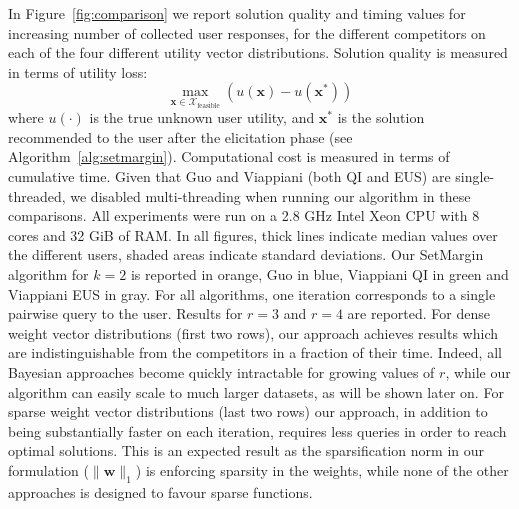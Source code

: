 \documentclass{article}
\renewcommand\[{\begin{equation}}
\renewcommand\]{\end{equation}}
\newcommand{\calvar}[1]{\ensuremath{\mathcal{#1}}}
\newcommand{\calX}{\calvar{X}}
\newcommand{\vecvar}[1]{\ensuremath{\boldsymbol{#1}}}
\newcommand{\vw}{\vecvar{w}}
\newcommand{\vx}{\vecvar{x}}
\newcommand{\andrea}[1]{{\bf \textcolor{blue}{{\fbox{Andrea:} #1}}}}
\newcommand{\stefano}[1]{{\bf \textcolor{green}{{\fbox{Stefano:} #1}}}}
\begin{document}

In Figure~\ref{fig:comparison} we report solution quality and timing
values for increasing number of collected user responses, for the
different competitors on each of the four different utility vector
distributions. Solution quality is measured in terms of utility loss:
%
$$ \max_{\vx\in\calX_\text{feasible}} \left( u(\vx) - u(\vx^*) \right) $$
%
where $u(\cdot)$ is the true unknown user utility, and $\vx^*$ is the
solution recommended to the user after the elicitation phase (see
Algorithm~\ref{alg:setmargin}). Computational cost is measured in
terms of cumulative time. Given that Guo and Viappiani (both QI and
EUS) are single-threaded, we disabled multi-threading when running our
algorithm in these comparisons. All experiments were run on a 2.8 GHz Intel
Xeon CPU with 8 cores and 32 GiB of RAM.
In all figures, thick lines indicate median values over the different
users, shaded areas indicate standard deviations. Our {\sc SetMargin}
algorithm for $k=2$ is reported in orange, Guo in blue, Viappiani QI
in green and Viappiani EUS in gray. For all algorithms, one iteration
corresponds to a single pairwise query to the user.  Results for $r=3$
and $r=4$ are reported.  For dense weight vector distributions (first
two rows), our approach achieves results which are indistinguishable
from the competitors in a fraction of their time.  Indeed, all
Bayesian approaches become quickly intractable for growing values of $r$,
while our algorithm can easily scale to much larger datasets, as will
be shown later on. For sparse weight vector distributions (last two
rows) our approach, in addition to being substantially faster on each
iteration, requires less queries in order to reach optimal
solutions. This is an expected result as the sparsification norm in
our formulation ($\| \vw \|_1$) is enforcing sparsity in the weights, 
while none of the other approaches is %
designed to favour sparse functions.



\end{document}
